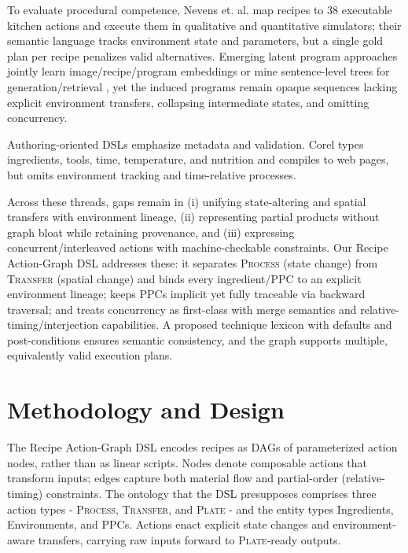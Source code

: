 \documentclass[sigconf]{acmart}
\begin{document}
To evaluate procedural competence, Nevens et. al. \cite{nevens2024benchmark} map recipes to 38 executable kitchen actions and execute them in qualitative and quantitative simulators; their semantic language tracks environment state and parameters, but a single gold plan per recipe penalizes valid alternatives. Emerging latent program approaches jointly learn image/recipe/program embeddings \cite{papadopoulos2022programs} or mine sentence-level trees for generation/retrieval \cite{wang2023structural}, yet the induced programs remain opaque sequences lacking explicit environment transfers, collapsing intermediate states, and omitting concurrency.

Authoring-oriented DSLs emphasize metadata and validation. Corel \cite{roorda2021corel} types ingredients, tools, time, temperature, and nutrition and compiles to web pages, but omits environment tracking and time-relative processes.

Across these threads, gaps remain in (i) unifying state-altering and spatial transfers with environment lineage, (ii) representing partial products without graph bloat while retaining provenance, and (iii) expressing concurrent/interleaved actions with machine-checkable constraints. Our Recipe Action-Graph DSL addresses these: it separates \textsc{Process} (state change) from \textsc{Transfer} (spatial change) and binds every ingredient/PPC to an explicit environment lineage; keeps PPCs implicit yet fully traceable via backward traversal; and treats concurrency as first-class with merge semantics and relative-timing/interjection capabilities. A proposed technique lexicon with defaults and post-conditions ensures semantic consistency, and the graph supports multiple, equivalently valid execution plans.

\section{Methodology and Design}

The Recipe Action-Graph DSL encodes recipes as DAGs of parameterized action nodes, rather than as linear scripts. Nodes denote composable actions that transform inputs; edges capture both material flow and partial-order (relative-timing) constraints. The ontology that the DSL presupposes comprises three action types - \textsc{Process}, \textsc{Transfer}, and \textsc{Plate} - and the entity types Ingredients, Environments, and PPCs. Actions enact explicit state changes and environment-aware transfers, carrying raw inputs forward to \textsc{Plate}-ready outputs.
\end{document}
